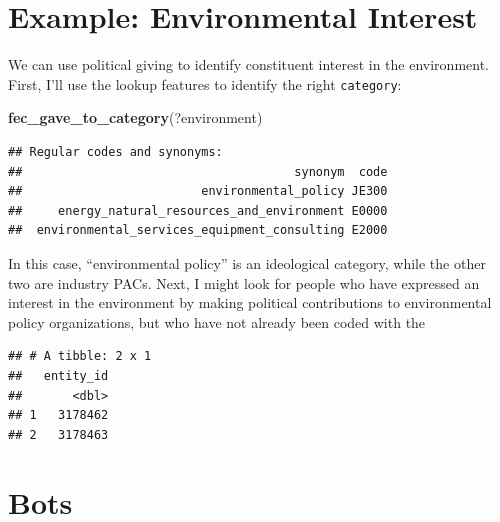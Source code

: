 \documentclass[]{book}
\newenvironment{Shaded}{\begin{snugshade}}{\end{snugshade}}
\newcommand{\KeywordTok}[1]{\textcolor[rgb]{0.13,0.29,0.53}{\textbf{#1}}}
\newcommand{\NormalTok}[1]{#1}
\newcommand{\OperatorTok}[1]{\textcolor[rgb]{0.81,0.36,0.00}{\textbf{#1}}}
\newcommand{\StringTok}[1]{\textcolor[rgb]{0.31,0.60,0.02}{#1}}
\begin{document}
\hypertarget{example-environmental-interest}{%
\section{Example: Environmental Interest}\label{example-environmental-interest}}

We can use political giving to identify constituent interest in the environment. First, I'll use the lookup features to identify the right \texttt{category}:

\begin{Shaded}
\begin{Highlighting}[]
\KeywordTok{fec_gave_to_category}\NormalTok{(?environment)}
\end{Highlighting}
\end{Shaded}

\begin{verbatim}
## Regular codes and synonyms:
##                                      synonym  code
##                         environmental_policy JE300
##     energy_natural_resources_and_environment E0000
##  environmental_services_equipment_consulting E2000
\end{verbatim}

In this case, ``environmental policy'' is an ideological category, while the other two are industry PACs. Next, I might look for people who have expressed an interest in the environment by making political contributions to environmental policy organizations, but who have not already been coded with the

\begin{Shaded}
\end{Shaded}

\begin{verbatim}
## # A tibble: 2 x 1
##   entity_id
##       <dbl>
## 1   3178462
## 2   3178463
\end{verbatim}

\hypertarget{bots}{%
\section{Bots}\label{bots}}
\end{document}
